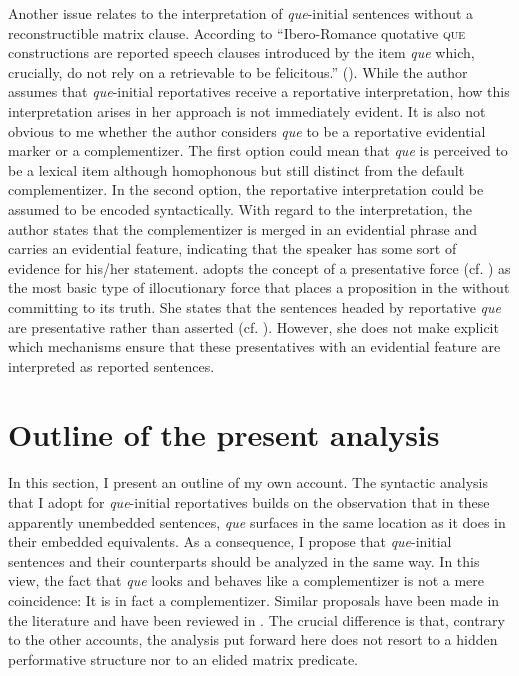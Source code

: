 Another  issue  relates to  the interpretation of  \emph{que}-initial sentences without a reconstructible matrix clause.   According to \citet{Corr2016} ``Ibero-Romance quotative \textsc{que} 	constructions are reported speech clauses introduced by the item \emph{que} which,
crucially, do not rely on a retrievable \emph{} to be felicitous.'' (\citealt[145]{Corr2016}). While the author assumes that \emph{que}-initial reportatives receive a reportative interpretation,  how this interpretation arises in her approach is not immediately evident. It is also not obvious to me whether the author considers \emph{que} to be a reportative evidential marker or a complementizer. The first option could mean that \emph{que} is perceived to be  a lexical item although homophonous  but still distinct from the default complementizer.  In the second option, the  reportative interpretation could be assumed to be   encoded syntactically. With regard to the interpretation, the author states that the complementizer is merged in an evidential phrase and carries an evidential feature, indicating that the speaker has some sort of evidence for his/her statement.  \citet[159--169]{Corr2016} adopts the concept of a presentative force (cf. \citealt{Dechaine2017}) as the most basic type of illocutionary force that  places a proposition in the  without committing to its truth. She  states  that the sentences headed by reportative \emph{que} are presentative rather than asserted (cf. ). However, she does not make explicit which mechanisms ensure that these presentatives with an evidential feature are interpreted  as reported sentences.


\section{Outline of the present analysis}\label{sec:insubanalysis}\largerpage
In this section, I present an outline of my own account. 
The syntactic analysis that I adopt for \emph{que}-initial reportatives builds on the observation that in these apparently unembedded sentences,  \emph{que} surfaces in the same location as it does in their embedded equivalents. As a consequence, I propose   that  \emph{que}-initial sentences and their counterparts should be analyzed in the same way.  In this view, the fact that   \emph{que} looks and behaves like a complementizer is not a mere coincidence:   It is in  fact a complementizer.  Similar proposals have  been made in the literature  and have been reviewed in  . The crucial difference is that, contrary to the other accounts,  the analysis put forward here does not resort to a hidden performative structure nor to an elided matrix predicate. 

